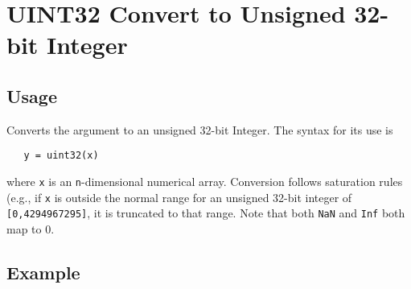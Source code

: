 \section{UINT32 Convert to Unsigned 32-bit Integer}

\subsection{Usage}

Converts the argument to an unsigned 32-bit Integer.  The syntax
for its use is
\begin{verbatim}
   y = uint32(x)
\end{verbatim}
where \verb|x| is an \verb|n|-dimensional numerical array.  Conversion
follows saturation rules (e.g., if \verb|x| is outside the normal
range for an unsigned 32-bit integer of \verb|[0,4294967295]|, it is
truncated to that range. Note that both \verb|NaN| and \verb|Inf| both map to 0.
\subsection{Example}

